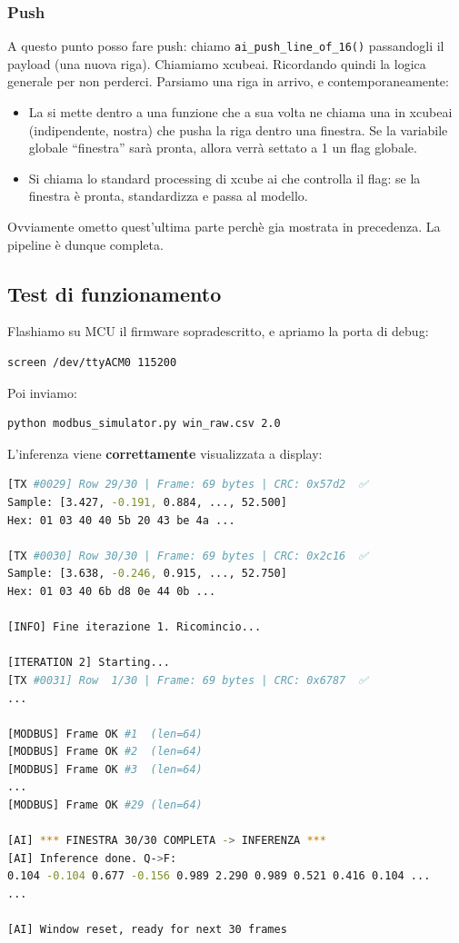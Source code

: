 \subsubsection{Push}
A questo punto posso fare push: chiamo \texttt{ai\_push\_line\_of\_16()} passandogli il payload (una nuova riga). Chiamiamo xcubeai. Ricordando quindi la logica generale per non perderci. Parsiamo una riga in arrivo, e contemporaneamente:
\begin{itemize}
    \item La si mette dentro a una funzione che a sua volta ne chiama una in xcubeai (indipendente, nostra) che pusha la riga dentro una finestra. Se la variabile globale ``finestra'' sarà pronta, allora verrà settato a 1 un flag globale.
    \item Si chiama lo standard processing di xcube ai che controlla il flag: se la finestra è pronta, standardizza e passa al modello.
\end{itemize}

Ovviamente ometto quest'ultima parte perchè gia mostrata in precedenza. La pipeline è dunque completa.

\subsection{Test di funzionamento}

Flashiamo su MCU il firmware sopradescritto, e apriamo la porta di debug:

\begin{verbatim}
screen /dev/ttyACM0 115200
\end{verbatim}

Poi inviamo:

\begin{verbatim}
python modbus_simulator.py win_raw.csv 2.0
\end{verbatim}

L'inferenza viene \textbf{correttamente} visualizzata a display:

\begin{lstlisting}[language=bash]
[TX #0029] Row 29/30 | Frame: 69 bytes | CRC: 0x57d2  ✅
Sample: [3.427, -0.191, 0.884, ..., 52.500]
Hex: 01 03 40 40 5b 20 43 be 4a ...

[TX #0030] Row 30/30 | Frame: 69 bytes | CRC: 0x2c16  ✅
Sample: [3.638, -0.246, 0.915, ..., 52.750]
Hex: 01 03 40 6b d8 0e 44 0b ...

[INFO] Fine iterazione 1. Ricomincio...

[ITERATION 2] Starting...
[TX #0031] Row  1/30 | Frame: 69 bytes | CRC: 0x6787  ✅
...

[MODBUS] Frame OK #1  (len=64)
[MODBUS] Frame OK #2  (len=64)
[MODBUS] Frame OK #3  (len=64)
...
[MODBUS] Frame OK #29 (len=64)

[AI] *** FINESTRA 30/30 COMPLETA -> INFERENZA ***
[AI] Inference done. Q->F:
0.104 -0.104 0.677 -0.156 0.989 2.290 0.989 0.521 0.416 0.104 ...
...

[AI] Window reset, ready for next 30 frames
\end{lstlisting}

